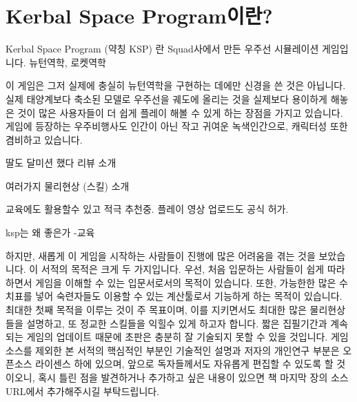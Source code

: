 \chapter*{Kerbal Space Program이란?}
Kerbal Space Program (약칭 KSP) 란 Squad사에서 만든 우주선 시뮬레이션 게임입니다.
뉴턴역학, 로켓역학

이 게임은 그저 실제에 충실히 뉴턴역학을 구현하는 데에만 신경을 쓴 것은 아닙니다. 실제 태양계보다 축소된 모델로 우주선을 궤도에 올리는 것을 실제보다 용이하게 해놓은 것이 많은 사용자들이 더 쉽게 플레이 해볼 수 있게 하는 장점을 가지고 있습니다. 게임에 등장하는 우주비행사도 인간이 아닌 작고 귀여운 녹색인간으로, 캐릭터성 또한 겸비하고 있습니다.

딸도 달미션 했다 리뷰 소개

여러가지 물리현상 (스킬) 소개

교육에도 활용할수 있고 적극 추천중. 플레이 영상 업로드도 공식 허가.

ksp는 왜 좋은가
-교육

하지만, 새롭게 이 게임을 시작하는 사람들이 진행에 많은 어려움을 겪는 것을 보았습니다. 이 서적의 목적은 크게 두 가지입니다. 
우선, 처음 입문하는 사람들이 쉽게 따라하면서 게임을 이해할 수 있는 입문서로서의 목적이 있습니다.
또한, 가능한한 많은 수치표를 넣어 숙련자들도 이용할 수 있는 계산툴로서 기능하게 하는 목적이 있습니다.
최대한 첫째 목적을 이루는 것이 주 목표이며, 이를 지키면서도 최대한 많은 물리현상들을 설명하고, 또 정교한 스킬들을 익힐수 있게 하고자 합니다.
짧은 집필기간과 계속되는 게임의 업데이트 때문에 초판은 충분히 잘 기술되지 못할 수 있을 것입니다.
게임소스를 제외한 본 서적의 핵심적인 부분인 기술적인 설명과 저자의 개인연구 부분은 오픈소스 라이센스 하에 있으며, 앞으로 독자들께서도 자유롭게 편집할 수 있도록 할 것이오니,
혹시 틀린 점을 발견하거나 추가하고 싶은 내용이 있으면 책 마지막 장의 소스 URL에서 추가해주시길 부탁드립니다.

